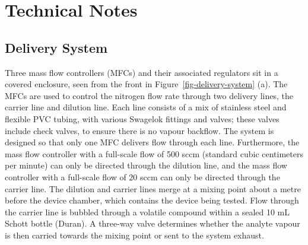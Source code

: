 \documentclass[
  a4paper,
]{scrbook}
\begin{document}
\hypertarget{technical-notes}{%
\section{Technical Notes}\label{technical-notes}}

\hypertarget{sec-delivery-system}{%
\subsection{Delivery System}\label{sec-delivery-system}}

Three mass flow controllers (MFCs) and their associated regulators sit
in a covered enclosure, seen from the front in
Figure~\ref{fig-delivery-system} (a). The MFCs are used to control the
nitrogen flow rate through two delivery lines, the carrier line and
dilution line. Each line consists of a mix of stainless steel and
flexible PVC tubing, with various Swagelok fittings and valves; these
valves include check valves, to ensure there is no vapour backflow. The
system is designed so that only one MFC delivers flow through each line.
Furthermore, the mass flow controller with a full-scale flow of 500 sccm
(standard cubic centimeters per minute) can only be directed through the
dilution line, and the mass flow controller with a full-scale flow of 20
sccm can only be directed through the carrier line. The dilution and
carrier lines merge at a mixing point about a metre before the device
chamber, which contains the device being tested. Flow through the
carrier line is bubbled through a volatile compound within a sealed 10
mL Schott bottle (Duran). A three-way valve determines whether the
analyte vapour is then carried towards the mixing point or sent to the
system exhaust.
\end{document}
